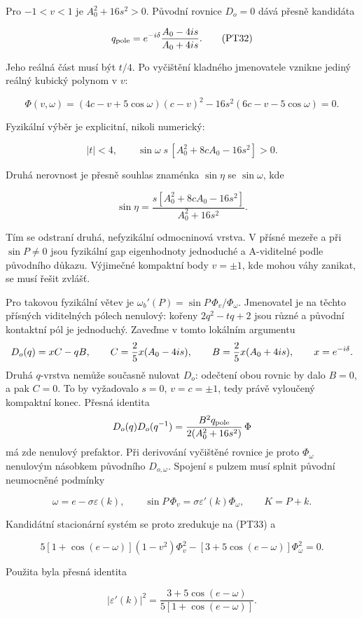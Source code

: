 \documentclass[11pt,a4paper]{article}
\theoremstyle{remark}\newtheorem{remark}[theorem]{Poznámka}
\numberwithin{equation}{section}
\begin{document}
Pro \(-1<v<1\) je \(A_0^2+16s^2>0\).
Původní rovnice \(D_o=0\) dává přesně kandidáta

\[
q_{\rm pole}
=e^{-i\delta}\frac{A_0-4is}{A_0+4is}.
\tag{PT32}
\]

Jeho reálná část musí být \(t/4\). Po vyčištění kladného
jmenovatele vznikne jediný reálný kubický polynom v \(v\):

\[
\boxed{
\Phi(v,\omega)=
(4c-v+5\cos\omega)(c-v)^2
-16s^2(6c-v-5\cos\omega)=0.
}
\tag{PT33}
\]

Fyzikální výběr je explicitní, nikoli numerický:

\[
|t|<4,\qquad
\sin\omega\;s\,
[A_0^2+8cA_0-16s^2]>0.
\tag{PT34}
\]

Druhá nerovnost je přesně souhlas znaménka
\(\sin\eta\) se \(\sin\omega\), kde

\[
\sin\eta=
\frac{s[A_0^2+8cA_0-16s^2]}{A_0^2+16s^2}.
\]

Tím se odstraní druhá, nefyzikální odmocninová vrstva.
V přísné mezeře a při \(\sin P\ne0\) jsou fyzikální gap
eigenhodnoty jednoduché a A-viditelné podle původního důkazu.
Výjimečné kompaktní body \(v=\pm1\), kde mohou váhy zanikat,
se musí řešit zvlášť.

Pro takovou fyzikální větev je
\(\omega_b'(P)=\sin P\,\Phi_v/\Phi_\omega\).
Jmenovatel je na těchto přísných viditelných pólech nenulový:
kořeny \(2q^2-tq+2\) jsou různé a původní kontaktní pól je
jednoduchý. Zaveďme v tomto lokálním argumentu
\[
D_o(q)=xC-qB,\qquad
C={2\over5}x(A_0-4is),\qquad
B={2\over5}x(A_0+4is),\qquad x=e^{-i\delta}.
\]
Druhá \(q\)-vrstva nemůže současně nulovat \(D_o\):
odečtení obou rovnic by dalo \(B=0\), a pak \(C=0\).
To by vyžadovalo \(s=0\), \(v=c=\pm1\), tedy právě
vyloučený kompaktní konec. Přesná identita
\[
D_o(q)D_o(q^{-1})
={B^2q_{\rm pole}\over2(A_0^2+16s^2)}\,\Phi
\]
má zde nenulový prefaktor. Při derivování vyčištěné rovnice
je proto \(\Phi_\omega\) nenulovým násobkem původního
\(D_{o,\omega}\).
Spojení s pulzem musí splnit původní neumocněné podmínky

\[
\omega=e-\sigma\varepsilon(k),\qquad
\sin P\,\Phi_v
=\sigma\varepsilon'(k)\Phi_\omega,\qquad K=P+k.
\tag{PT35}
\]

Kandidátní stacionární systém se proto zredukuje na (PT33) a

\[
\boxed{
5[1+\cos(e-\omega)](1-v^2)\Phi_v^2
-[3+5\cos(e-\omega)]\Phi_\omega^2=0.
}
\tag{PT36}
\]

Použita byla přesná identita

\[
|\varepsilon'(k)|^2
=\frac{3+5\cos(e-\omega)}{5[1+\cos(e-\omega)]}.
\]
\end{document}
